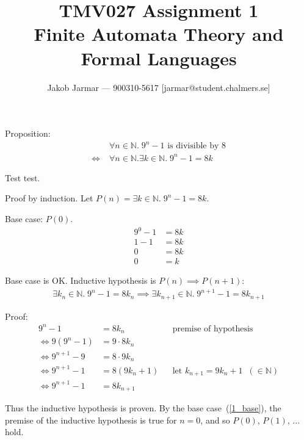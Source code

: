 \documentclass{article}
\title{TMV027 Assignment 1 \\ Finite Automata Theory and Formal Languages}
\author{Jakob Jarmar --- 900310-5617 [jarmar@student.chalmers.se]}
\date{}
\begin{document}
\maketitle

\section{}
Proposition:
\begin{equation}
\begin{split}
& \forall n \in \mathbb{N}.\; 9^n - 1 \text{ is divisible by } 8 \\
\iff \; & \forall n \in \mathbb{N} . \exists k \in \mathbb{N}.\; 9^n - 1 = 8k
\end{split}
\end{equation}

Test test.

Proof by induction. Let $P(n) = \exists k \in \mathbb{N}.\; 9^n - 1 = 8k$.

Base case: $P(0)$.
\begin{equation} \label{1_base}
\begin{split}
9^0 - 1 & = 8k \\
1 - 1 & = 8k \\
0 & = 8k \\
0 & = k
\end{split}
\end{equation}

Base case is OK. Inductive hypothesis is $P(n) \implies P(n+1)$:
\begin{equation}
\begin{split}
\exists k_n \in \mathbb{N} .\; 9^n - 1 = 8k_n \implies \exists k_{n+1} \in \mathbb{N}.\; 9^{n+1} - 1 = 8k_{n+1}
\end{split}
\end{equation}

Proof:
\begin{align}
9^n - 1 & = 8k_n && \text{premise of hypothesis} \\
\iff 9(9^n - 1) & = 9 \cdot 8k_n \\
\iff 9^{n+1} - 9 & = 8 \cdot 9k_n \\
\iff 9^{n+1} - 1 & = 8(9k_n + 1) && \text{let $k_{n+1} = 9k_n+1 \;\; (\in \mathbb{N})$} \\
\iff 9^{n+1} - 1 & = 8k_{n+1}
\end{align}

Thus the inductive hypothesis is proven. By the base case~(\ref{1_base}), the premise of the inductive hypothesis is true for $n = 0$, and so $P(0)$, $P(1)$, ... hold.
\end{document}

